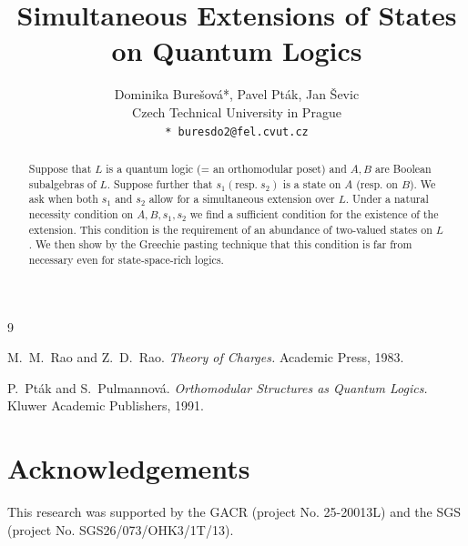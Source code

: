 \documentclass[a4paper]{article}
\date{}
\begin{document}
\setcounter{page}{1}

\title{Simultaneous Extensions of States on Quantum Logics}

\author{
Dominika Bure\v{s}ov\'{a}*, Pavel Pt\'{a}k, Jan \v{S}evic\\
Czech Technical University in Prague\\[1ex]
\texttt{* buresdo2@fel.cvut.cz}}


\maketitle

\begin{abstract}
   Suppose that $L$ is a quantum logic (= an orthomodular poset) and
$A,B$ are Boolean subalgebras of $L$. Suppose further that
$s_1(\mathrm{resp.}\; s_2)$ is a state on $A$
(resp. on $B$). We ask when both $s_1$ and $s_2$
allow for a simultaneous extension over $L$.
Under a natural necessity condition on
$A,B,s_1,s_2$ we find a sufficient condition
for the existence of the extension.
This condition is the requirement of an abundance
of two-valued states on $L$. We then show
by the Greechie pasting technique that this condition is far from necessary even for state-space-rich logics.
\end{abstract}

\begin{thebibliography}{9}

M.~M.~Rao and Z.~D.~Rao.
\newblock \emph{Theory of Charges.}
\newblock Academic Press, 1983.

P.~Pt\'ak and S.~Pulmannov\'a.
\newblock \emph{Orthomodular Structures as Quantum Logics.}
\newblock Kluwer Academic Publishers, 1991.

\end{thebibliography}

\section*{Acknowledgements}
This research was supported by the GACR (project No. 25-20013L) and the SGS (project No. SGS26/073/OHK3/1T/13).
\end{document}
